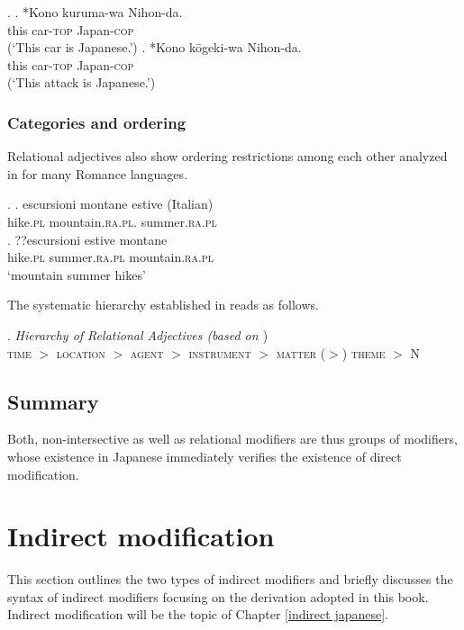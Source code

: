\documentclass [output=book,colorlinks,citecolor=brown]{langscibook}
\begin{document}
\ex. \ag. *Kono kuruma-wa Nihon-da. \label{nihon}\\
this car-\textsc{top} Japan-\textsc{cop}\\
(`This car is Japanese.’)
\bg. *Kono kōgeki-wa Nihon-da.\\
this car-\textsc{top} Japan-\textsc{cop}\\
(`This attack is Japanese.’)

\subsubsection{Categories and ordering} \label{ordering relational}

Relational adjectives also show ordering restrictions among each other analyzed in \citet{bortolotto:2016:RA} for many Romance languages.

\ex. \ag. escursioni montane estive (Italian)\\
hike.\textsc{pl} mountain.\textsc{ra.pl}. summer.\textsc{ra.pl}\\
\bg. ??escursioni estive montane\\
hike.\textsc{pl} summer.\textsc{ra.pl} mountain.\textsc{ra.pl}\\
`mountain summer hikes’ \null\hfill \citep[148]{bortolotto:2016:RA}

The systematic hierarchy established in \citet{bortolotto:2016:RA} reads as follows. %

\ex. \emph{Hierarchy of Relational Adjectives (based on \citealt[180]{bortolotto:2016:RA}})\\
\textsc{time} $>$ \textsc{location} $>$ \textsc{agent} $>$ \textsc{instrument} $>$ \textsc{matter} ($>$) \textsc{theme} $>$ N

\subsection{Summary}

Both, non-intersective as well as relational modifiers are thus groups of modifiers, whose existence in Japanese immediately verifies the existence of direct modification.

\section{Indirect modification} \label{dP}

This section outlines the two types of indirect modifiers and briefly discusses the syntax of indirect modifiers focusing on the derivation adopted in this book. Indirect modification will be the topic of Chapter \ref{indirect japanese}.
\end{document}
